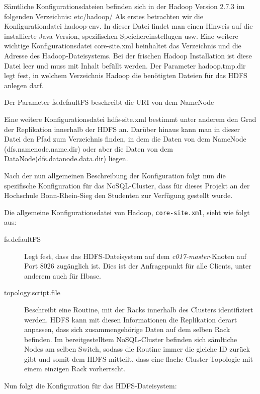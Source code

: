 Sämtliche Konfigurationsdateien befinden sich in der Hadoop Version 2.7.3 im folgenden Verzeichnis: etc/hadoop/
Als erstes betrachten wir die Konfigurationdatei hadoop-env. In dieser Datei findet man einen Hinweis auf die installierte Java Version, spezifischen Speichereinstellugen usw. 
Eine weitere wichtige Konfigurationsdatei core-site.xml beinhaltet das Verzeichnis und die Adresse des Hadoop-Dateisystems. Bei der frischen Hadoop Installation ist diese Datei leer und muss mit Inhalt befüllt werden.
Der Parameter hadoop.tmp.dir legt fest, in welchem Verzeichnis Hadoop die benötigten Dateien für das HDFS anlegen darf.

Der Parameter fs.defaultFS beschreibt die URI von dem NameNode

Eine weitere Konfigurationsdatei hdfs-site.xml bestimmt unter anderem den Grad der Replikation innerhalb der HDFS an.
Darüber hinaus kann man in dieser Datei den Pfad zum Verzeichnis finden, in dem die Daten von dem NameNode (dfs.namenode.name.dir) oder aber die Daten von dem DataNode(dfs.datanode.data.dir) liegen.

Nach der nun allgemeinen Beschreibung der Konfiguration folgt nun die spezifische Konfiguration für das NoSQL-Cluster, dass für
dieses Projekt an der Hochschule Bonn-Rhein-Sieg den Studenten zur Verfügung gestellt wurde.

Die allgemeine Konfigurationsdatei von Hadoop, \texttt{core-site.xml}, sieht wie folgt aus:
\lstset{basicstyle=\small}


\begin{description}
	\item[fs.defaultFS] Legt fest, dass das HDFS-Dateisystem auf dem \textit{c017-master}-Knoten auf Port $8026$ zugänglich ist.
	Dies ist der Anfragepunkt für alle Clients, unter anderem auch für Hbase.
	\item[topology.script.file] Beschreibt eine Routine, mit der Racks innerhalb des Clusters identifiziert werden. HDFS kann mit diesen
	Informationen die Replikation derart anpassen, dass sich zusammengehörige Daten auf dem selben Rack befinden. Im bereitgestelltem
	NoSQL-Cluster befinden sich sämltiche Nodes am selben Switch, sodass die Routine immer die gleiche ID zurück gibt
	und somit dem HDFS mitteilt. dass eine flache Cluster-Topologie mit einem einzigen Rack vorherrscht.
\end{description}

Nun folgt die Konfiguration für das HDFS-Dateisystem:
\lstset{basicstyle=\small}


